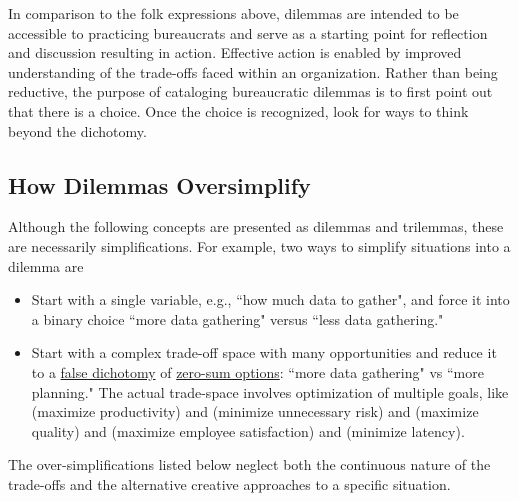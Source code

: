 In comparison to the folk expressions above, dilemmas are intended to be accessible to practicing bureaucrats and serve as a starting point for reflection and discussion resulting in action. Effective action is enabled by improved understanding of the trade-offs faced within an organization. Rather than being reductive, the purpose of cataloging bureaucratic dilemmas is to first point out that there is a choice. Once the choice is recognized, look for ways to think beyond the dichotomy.

\subsection*{How Dilemmas Oversimplify}

Although the following concepts are presented as dilemmas and trilemmas, these are necessarily simplifications. For example, two ways to simplify situations into a dilemma are
\begin{itemize}
    \item Start with a single variable, e.g., ``how much data to gather", and force it into a binary choice ``more data gathering" versus ``less data gathering."
    
    \item Start with a complex trade-off space with many opportunities and reduce it to a \href{https://en.wikipedia.org/wiki/False_dilemma}{false dichotomy} 
    of 
    \href{https://en.wikipedia.org/wiki/Zero-sum_thinking}{zero-sum options}: 
    ``more data gathering" vs ``more planning." The actual trade-space involves optimization of multiple goals, like (maximize productivity) and (minimize unnecessary risk) and (maximize quality) and (maximize employee satisfaction) and (minimize latency). 
\end{itemize}
The over-simplifications listed below neglect both the continuous nature of the trade-offs and the alternative creative approaches to a specific situation. 

